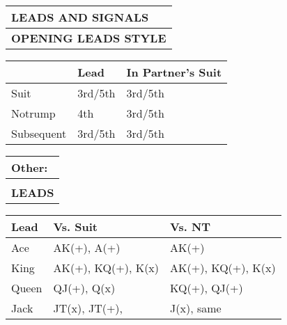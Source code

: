 \documentclass{article}
\begin{document}
\begin{minipage}{90mm}
	\begin{tabular}{| p{88mm} |}
		\hline
		\cellcolor[gray]{0.9} \textbf{LEADS AND SIGNALS} \\ \hline
		\textbf{OPENING LEADS STYLE} \\ \hline
	\end{tabular}
	\begin{tabular}{| p{15.25mm} | p{32mm} | p{32mm} |}
		& Lead & In Partner's Suit \\ \hline
		Suit & 3rd/5th & 3rd/5th \\ \hline
		Notrump & 4th & 3rd/5th \\ \hline
		Subsequent & 3rd/5th & 3rd/5th \\ \hline
	\end{tabular}
	\begin{tabular}{| p{88mm} |}
		Other: \\ \hline
		\\ \hline
		\textbf{LEADS} \\ \hline
	\end{tabular}
	\begin{tabular}{| p{15.25mm} | p{32mm} | p{32mm} |}
		Lead & Vs. Suit & Vs. NT \\ \hline
		Ace & AK(+), A(+) & AK(+)\\ \hline
		King & AK(+), KQ(+), K(x) & AK(+), KQ(+), K(x) \\ \hline
		Queen & QJ(+), Q(x) & KQ(+), QJ(+) \\ \hline
		Jack & JT(x), JT(+), & J(x), same \\ \hline
	\end{tabular}
	\begin{tabular}{| p{88mm} |}


\end{tabular}
\end{minipage}
\end{document}
